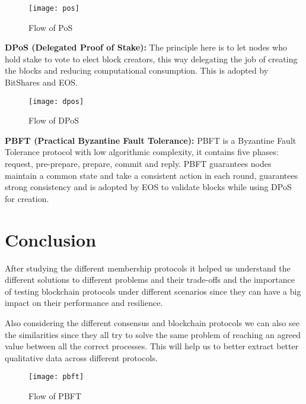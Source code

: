\begin{figure}[h]
	\centering
	\texttt{[image: pos]}
	\caption{Flow of PoS}
	\label{fig:pos}
\end{figure}


\textbf{DPoS (Delegated Proof of Stake):} The principle here is to let nodes who
hold stake to vote to elect block creators, this way delegating the job of creating
the blocks and reducing computational consumption. This is adopted by BitShares and EOS.

\begin{figure}[h]
	\centering
	\texttt{[image: dpos]}
	\caption{Flow of DPoS}
	\label{fig:dpos}
\end{figure}

\textbf{PBFT (Practical Byzantine Fault Tolerance):} PBFT is a Byzantine Fault 
Tolerance protocol with low algorithmic complexity, it contains five phases: request,
pre-prepare, prepare, commit and reply. PBFT guarantees nodes maintain a common state and take
a consistent action in each round, guarantees strong consistency and is adopted by
EOS to validate blocks while using DPoS for creation.

\section{Conclusion}\label{sec:background_conclusion}

After studying the different membership protocols it helped us understand the different solutions
to different problems and their trade-offs and the importance of testing blockchain protocols under different
scenarios since they can have a big impact on their performance and resilience.

Also considering the different consensus and blockchain protocols we can also see the similarities since they
all try to solve the same problem of reaching an agreed value between all the correct processes. This will
help us to better extract better qualitative data across different protocols.

\begin{figure}[h]
	\centering
	\texttt{[image: pbft]}
	\caption{Flow of PBFT}
	\label{fig:pbft}
\end{figure}